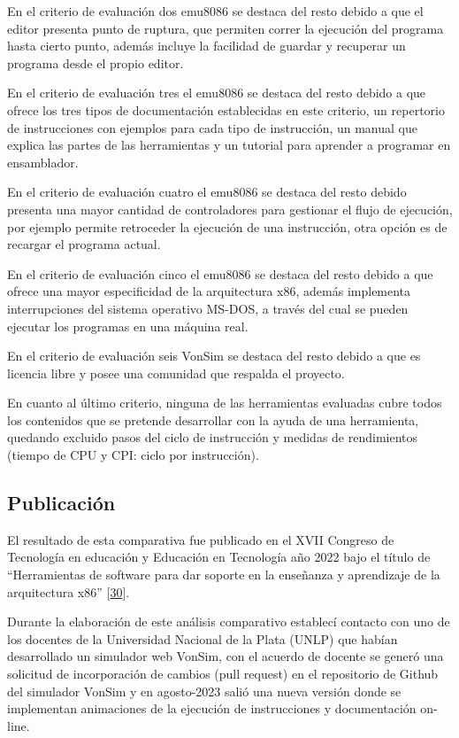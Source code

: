 \documentclass[12pt,twoside]{templates/unerthesis}
\begin{document}
En el criterio de evaluación dos emu8086 se destaca del resto debido a que el editor presenta punto de ruptura, que permiten correr la ejecución del programa hasta cierto punto, además incluye la facilidad de guardar y recuperar un programa desde el propio editor.

En el criterio de evaluación tres el emu8086 se destaca del resto debido a que ofrece los tres tipos de documentación establecidas en este criterio, un repertorio de instrucciones con ejemplos para cada tipo de instrucción, un manual que explica las partes de las herramientas y un tutorial para aprender a programar en ensamblador.

En el criterio de evaluación cuatro el emu8086 se destaca del resto debido presenta una mayor cantidad de controladores para gestionar el flujo de ejecución, por ejemplo permite retroceder la ejecución de una instrucción, otra opción es de recargar el programa actual.

En el criterio de evaluación cinco el emu8086 se destaca del resto debido a que ofrece una mayor especificidad de la arquitectura x86, además implementa interrupciones del sistema operativo MS-DOS, a través del cual se pueden ejecutar los programas en una máquina real.

En el criterio de evaluación seis VonSim se destaca del resto debido a que es licencia libre y posee una comunidad que respalda el proyecto.

En cuanto al último criterio, ninguna de las herramientas evaluadas cubre todos los contenidos que se pretende desarrollar con la ayuda de una herramienta, quedando excluido pasos del ciclo de instrucción y medidas de rendimientos (tiempo de CPU y CPI: ciclo por instrucción).

\hypertarget{publicaciuxf3n}{%
\subsection{Publicación}\label{publicaciuxf3n}}

El resultado de esta comparativa fue publicado en el XVII Congreso de Tecnología en educación y Educación en Tecnología año 2022 bajo el título de ``Herramientas de software para dar soporte en la enseñanza y aprendizaje de la arquitectura x86'' {[}\protect\hyperlink{ref-colombani_herramientas_2022}{30}{]}.

Durante la elaboración de este análisis comparativo establecí contacto con uno de los docentes de la Universidad Nacional de la Plata (UNLP) que habían desarrollado un simulador web VonSim, con el acuerdo de docente se generó una solicitud de incorporación de cambios (pull request) en el repositorio de Github del simulador VonSim y en agosto-2023 salió una nueva versión donde se implementan animaciones de la ejecución de instrucciones y documentación on-line.
\end{document}
